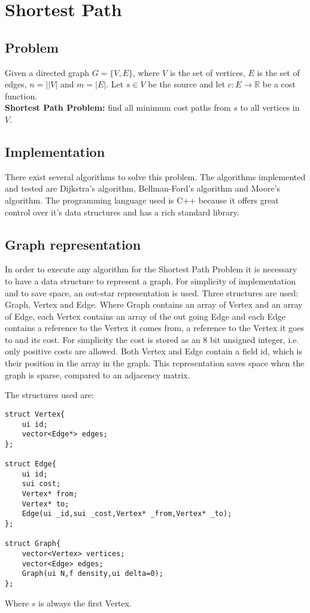 \section{Shortest Path}
\subsection{Problem}
Given a directed graph $G=\{V,E\}$, where $V$ is the set of vertices, $E$ is the set of edges, $n=||V|$ and $m=|E|$.
Let $s \in V$ be the source and let $c: E \to \mathbb{R}$ be a cost function.
\vspace{1em}\\
\textbf{Shortest Path Problem:} find all minimum cost paths from $s$ to all vertices in $V$.

\subsection{Implementation}
There exist several algorithms to solve this problem. The algorithms implemented and tested are Dijkstra's algorithm, Bellman-Ford's algorithm and Moore's algorithm.
The programming language used is C++ because it offers great control over it's data structures and has a rich standard library.

\subsection{Graph representation}
In order to execute any algorithm for the Shortest Path Problem it is necessary to have a data structure to represent a graph.
For simplicity of implementation and to save space, an out-star representation is used.
Three structures are used: Graph, Vertex and Edge. Where Graph contains an array of Vertex and an array of Edge, each Vertex contains an array of the out going Edge
and each Edge contains a reference to the Vertex it comes from, a reference to the Vertex it goes to and its cost. For simplicity the cost is stored as an 8 bit
unsigned integer, i.e. only positive costs are allowed. Both Vertex and Edge contain a field id,
which is their position in the array in the graph. This representation saves space when the graph is sparse, compared to an adjacency matrix.

The structures used are:
\begin{verbatim}
struct Vertex{
	ui id;
	vector<Edge*> edges;
};

struct Edge{
	ui id;
	sui cost;
	Vertex* from;
	Vertex* to;
	Edge(ui _id,sui _cost,Vertex* _from,Vertex* _to);
};

struct Graph{
	vector<Vertex> vertices;
	vector<Edge> edges;
	Graph(ui N,f density,ui delta=0);
};
\end{verbatim}
Where $s$ is always the first Vertex.

